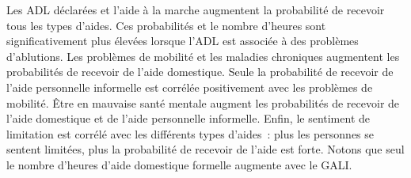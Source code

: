 \begin{Article}
\begin{refsection}[Bonnal]
Les ADL déclarées et l’aide à la marche augmentent la probabilité de recevoir tous les types d'aides. Ces probabilités et le nombre d’heures sont significativement plus élevées lorsque l’ADL est associée à des problèmes d’ablutions. Les problèmes de mobilité et les maladies chroniques augmentent les probabilités de recevoir de l'aide domestique. Seule la probabilité de recevoir de l’aide personnelle informelle est corrélée positivement avec les problèmes de mobilité. Être en mauvaise santé mentale augment les probabilités de recevoir de l’aide domestique et de l’aide personnelle informelle. Enfin, le sentiment de limitation est corrélé avec les différents types d'aides~: plus les personnes se sentent limitées, plus la probabilité de recevoir de l'aide est forte. Notons que seul le nombre d’heures d’aide domestique formelle augmente avec le GALI.

%
%
%
%
%


\end{refsection}
\end{Article}
